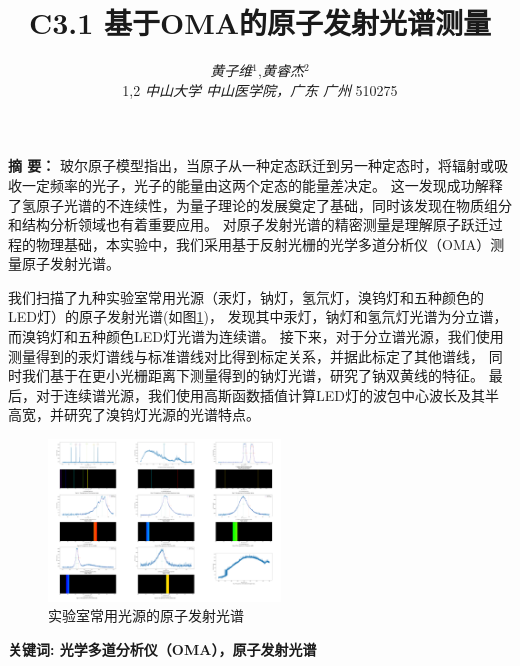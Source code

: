\documentclass[12pt,a4paper,UTF8]{ctexart}
\begin{document}
\title{\vspace{-2cm}\LARGE\bfseries C3.1 基于OMA的原子发射光谱测量\footnotemark[1]}
\author{\large\textit{黄子维}$^{1}$\footnotemark[2],\large\textit{黄睿杰}$^{2}$\footnotemark[3] \\ 
\small{1,2 \textit{中山大学 中山医学院，广东 广州 }510275}}
\date{}
\maketitle
\setcounter{page}{0}
\thispagestyle{empty}
\vspace{-1.5em}
\begin{spacing}{2.0}
{\bfseries 摘 {} 要：}
玻尔原子模型指出，当原子从一种定态跃迁到另一种定态时，将辐射或吸收一定频率的光子，光子的能量由这两个定态的能量差决定。
这一发现成功解释了氢原子光谱的不连续性，为量子理论的发展奠定了基础，同时该发现在物质组分和结构分析领域也有着重要应用。
对原子发射光谱的精密测量是理解原子跃迁过程的物理基础，本实验中，我们采用基于反射光栅的光学多道分析仪（OMA）测量原子发射光谱。

我们扫描了九种实验室常用光源（汞灯，钠灯，氢氘灯，溴钨灯和五种颜色的LED灯）的原子发射光谱(如图\ref{fig:0})，
发现其中汞灯，钠灯和氢氘灯光谱为分立谱，而溴钨灯和五种颜色LED灯光谱为连续谱。
接下来，对于分立谱光源，我们使用测量得到的汞灯谱线与标准谱线对比得到标定关系，并据此标定了其他谱线，
同时我们基于在更小光栅距离下测量得到的钠灯光谱，研究了钠双黄线的特征。
最后，对于连续谱光源，我们使用高斯函数插值计算LED灯的波包中心波长及其半高宽，并研究了溴钨灯光源的光谱特点。
\begin{figure}[htbp]
	\centering
	\includegraphics[width=0.55\textwidth]{attachments/Fig.0.png}
	\caption{实验室常用光源的原子发射光谱}
	\label{fig:0}
\end{figure}
\par
\vspace{-0.5em}
\bfseries{关键词}: 光学多道分析仪（OMA），原子发射光谱
\vspace{0.5em}
\end{spacing}
\end{document}

